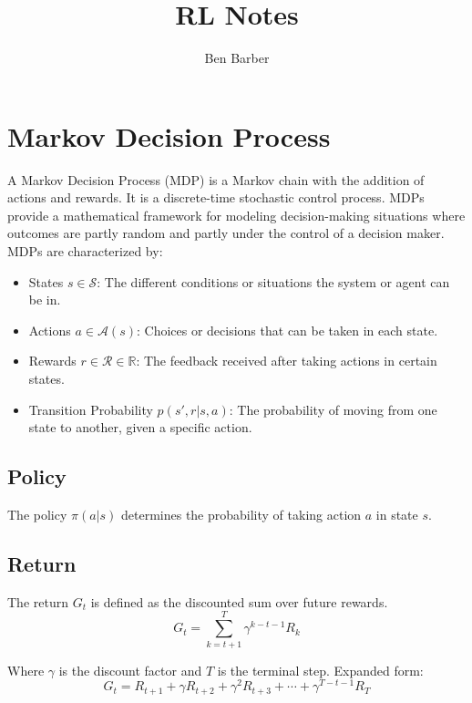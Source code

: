 \documentclass{article}
\title{RL Notes}
\author{Ben Barber}
\begin{document}
\maketitle



\section{Markov Decision Process}

A Markov Decision Process (MDP) is a Markov chain with the addition of actions and rewards. It is a discrete-time stochastic control process.
MDPs provide a mathematical framework for modeling decision-making situations where outcomes are partly random and partly under the control of a decision maker.
MDPs are characterized by:
\begin{itemize}
  \item States $s \in \mathcal{S}$: The different conditions or situations the system or agent can be in.
  \item Actions $a \in \mathcal{A}(s)$: Choices or decisions that can be taken in each state.
  \item Rewards $r \in \mathcal{R} \in \mathbb{R} $: The feedback received after taking actions in certain states.
  \item Transition Probability $p(s',r|s,a)$: The probability of moving from one state to another, given a specific action.
\end{itemize}

\subsection{Policy}
The policy $\pi(a|s)$ determines the probability of taking action $a$ in state $s$.

\subsection{Return}
The return $G_t$ is defined as the discounted sum over future rewards.
\begin{equation}
  G_t = \sum_{k=t+1}^{T}\gamma^{k-t-1}R_k
\end{equation}

Where $\gamma$ is the discount factor and $T$ is the terminal step. Expanded form:
\begin{equation}
  G_t = R_{t+1} + \gamma R_{t+2} + \gamma ^2 R_{t+3} + \cdots + \gamma ^{T-t-1} R_T
\end{equation}
\end{document}
